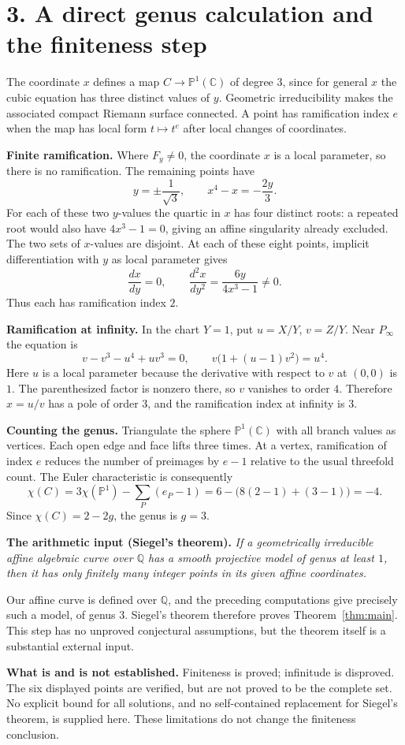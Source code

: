 \documentclass[11pt,a4paper]{article}
\newcommand{\C}{\mathbb C}
\newcommand{\Q}{\mathbb Q}
\newcommand{\PP}{\mathbb P}
\begin{document}
\newpage
\section*{3. A direct genus calculation and the finiteness step}
The coordinate $x$ defines a map $C\to\PP^1(\C)$ of degree $3$, since
for general $x$ the cubic equation has three distinct values of $y$.
Geometric irreducibility makes the associated compact Riemann surface
connected. A point has ramification index $e$ when the map has local form
$t\mapsto t^e$ after local changes of coordinates.

\textbf{Finite ramification.}
Where $F_y\ne0$, the coordinate $x$ is a local parameter, so there is
no ramification. The remaining points have
\[
y=\pm\frac1{\sqrt3},\qquad x^4-x=-\frac{2y}{3}.
\]
For each of these two $y$-values the quartic in $x$ has four distinct
roots: a repeated root would also have $4x^3-1=0$, giving an affine
singularity already excluded. The two sets of $x$-values are disjoint.
At each of these eight points, implicit differentiation with $y$ as local
parameter gives
\[
\frac{dx}{dy}=0,\qquad
\frac{d^2x}{dy^2}=\frac{6y}{4x^3-1}\ne0.
\]
Thus each has ramification index $2$.

\textbf{Ramification at infinity.}
In the chart $Y=1$, put $u=X/Y$, $v=Z/Y$. Near $P_\infty$ the equation is
\[
v-v^3-u^4+uv^3=0,
\qquad v\bigl(1+(u-1)v^2\bigr)=u^4.
\]
Here $u$ is a local parameter because the derivative with respect to $v$
at $(0,0)$ is $1$. The parenthesized factor is nonzero there, so $v$
vanishes to order $4$. Therefore $x=u/v$ has a pole of order $3$,
and the ramification index at infinity is $3$.

\textbf{Counting the genus.}
Triangulate the sphere $\PP^1(\C)$ with all branch values as vertices.
Each open edge and face lifts three times. At a vertex, ramification of
index $e$ reduces the number of preimages by $e-1$ relative to the usual
threefold count. The Euler characteristic is consequently
\[
\chi(C)=3\chi(\PP^1)-\sum_P(e_P-1)
       =6-\bigl(8(2-1)+(3-1)\bigr)=-4.
\]
Since $\chi(C)=2-2g$, the genus is $g=3$.

\textbf{The arithmetic input (Siegel's theorem).}
\emph{If a geometrically irreducible affine algebraic curve over $\Q$
has a smooth projective model of genus at least $1$, then it has only
finitely many integer points in its given affine coordinates.}

Our affine curve is defined over $\Q$, and the preceding computations
give precisely such a model, of genus $3$. Siegel's theorem therefore
proves Theorem~\ref{thm:main}. This step has no unproved conjectural
assumptions, but the theorem itself is a substantial external input.

\textbf{What is and is not established.}
Finiteness is proved; infinitude is disproved. The six displayed points
are verified, but are not proved to be the complete set. No explicit bound
for all solutions, and no self-contained replacement for Siegel's theorem,
is supplied here. These limitations do not change the finiteness conclusion.
\end{document}
